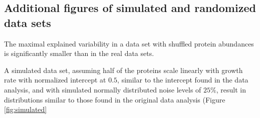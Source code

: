 \subsection{Additional figures of simulated and randomized data sets}
The maximal explained variability in a data set with shuffled protein abundances is significantly smaller than in the real data sets.

A simulated data set, assuming half of the proteins scale linearly with growth rate with normalized intercept at $0.5$, similar to the intercept found in the data analysis, and with simulated normally distributed noise levels of $25\%$, result in distributions similar to those found in the original data analysis (Figure \ref{fig:simulated}